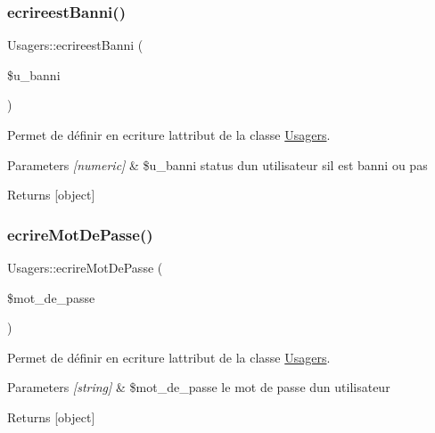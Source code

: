 \subsubsection{\texorpdfstring{ecrireest\+Banni()}{ecrireestBanni()}}
{\footnotesize\ttfamily Usagers\+::ecrireest\+Banni (\begin{DoxyParamCaption}\item[{}]{\$u\+\_\+banni }\end{DoxyParamCaption})}



Permet de définir en ecriture l\textquotesingle{}attribut de la classe \hyperlink{class_usagers}{Usagers}. 


\begin{DoxyParams}{Parameters}
{\em \mbox{[}numeric\mbox{]}} & \$u\+\_\+banni status d\textquotesingle{}un utilisateur s\textquotesingle{}il est banni ou pas \\
\hline
\end{DoxyParams}
\begin{DoxyReturn}{Returns}
\mbox{[}object\mbox{]} 
\end{DoxyReturn}
\mbox{\label{class_usagers_a0fca6236d08081758ee17be03440cd19}} 
\subsubsection{\texorpdfstring{ecrire\+Mot\+De\+Passe()}{ecrireMotDePasse()}}
{\footnotesize\ttfamily Usagers\+::ecrire\+Mot\+De\+Passe (\begin{DoxyParamCaption}\item[{}]{\$mot\+\_\+de\+\_\+passe }\end{DoxyParamCaption})}



Permet de définir en ecriture l\textquotesingle{}attribut de la classe \hyperlink{class_usagers}{Usagers}. 


\begin{DoxyParams}{Parameters}
{\em \mbox{[}string\mbox{]}} & \$mot\+\_\+de\+\_\+passe le mot de passe d\textquotesingle{}un utilisateur \\
\hline
\end{DoxyParams}
\begin{DoxyReturn}{Returns}
\mbox{[}object\mbox{]} 
\end{DoxyReturn}
\mbox{\label{class_usagers_a0753020bb935547da5c00f81e41b8237}} 
